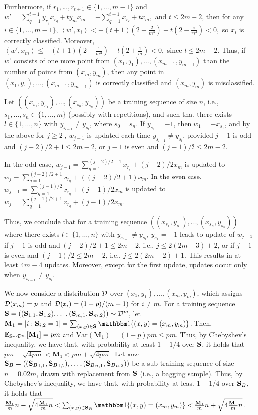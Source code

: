 Furthermore, if $r_1, \ldots, r_{t+1} \in \{1, \ldots, m-1\}$ and 
$
w' = \sum_{q=1}^{t+1} y_{r_q} x_{r_q} + t y_m x_m = -\sum_{q=1}^{t+1} x_{r_q} + t x_m,
$
and $t \leq 2m-2$, then for any $i \in \{1, \ldots, m-1\}$, 
$
\left\langle w', x_i \right\rangle < -(t+1)(2 - \frac{2}{m^3}) + t(2 - \frac{i}{m^4}) < 0,
$
so $x_i$ is correctly classified. Moreover, 
$
\left\langle w', x_m \right\rangle \leq -(t+1)(2 - \frac{1}{m^3}) + t(2 + \frac{1}{m}) < 0,
$
since $t\leq 2m-2$. Thus, if $w'$ consists of one more point from $(x_1, y_1), \ldots, (x_{m-1}, y_{m-1})$ than the number of points from $(x_m, y_m)$, then any point in $(x_1, y_1), \ldots, (x_{m-1}, y_{m-1})$ is correctly classified and $(x_m, y_m)$ is misclassified.

Let $((x_{s_{1}},y_{s_{1}}),\ldots,(x_{s_{n}},y_{s_{n}}))$ be a training sequence of size $n$, i.e., $s_{1},\ldots,s_{n}\in \{1,\ldots,m\}$ (possibly with repetitions), and such that there exists $l\in \{1,\ldots,n\}$ with $y_{s_{l-1}}\neq y_{s_{l}}$, where $s_{0}=s_{n}$. If $y_{s_{1}} = -1$, then $w_{1} = -x_{s_{1}}$, and by the above for $ j\geq 2 $ , $w_{j-1}$ is updated each time $y_{s_{l-1}}\neq y_{s_{l}}$, provided $j-1$ is odd and $(j-2)/2+1 \leq 2m-2$, or $j-1$ is even and $(j-1)/2 \leq 2m-2$.

In the odd case, $w_{j-1} = \sum_{q=1}^{(j-2)/2+1} x_{r_{q}} + (j-2)/2 x_{m}$ is updated to $w_{j} = \sum_{q=1}^{(j-2)/2+1} x_{r_{q}} + ((j-2)/2+1) x_{m}$. In the even case, $w_{j-1} = \sum_{q=1}^{(j-1)/2} x_{r_{q}} + (j-1)/2 x_{m}$ is updated to $w_{j} = \sum_{q=1}^{(j-1)/2+1} x_{r_{q}} + (j-1)/2 x_{m}$.

Thus, we conclude that for a training sequence $((x_{s_{1}},y_{s_{1}}),\ldots,(x_{s_{n}},y_{s_{n}}))$ where there exists $l \in \{1,\ldots,n\}$ with $y_{s_{l-1}}\neq y_{s_{l}}$, $y_{s_{1}} = -1$ leads to update of $ w_{j-1} $  if $j-1$ is odd and $(j-2)/2+1 \leq 2m-2$, i.e., $j \leq 2(2m-3)+2$, or if $j-1$ is even and $(j-1)/2 \leq 2m-2$, i.e., $j \leq 2(2m-2)+1$. This results in at least $4m-4$ updates. Moreover, except for the first update, updates occur only when $y_{s_{l-1}}\neq y_{s_{l}}$.

We now consider a distribution $\mathcal{D}$ over $(x_{1},y_{1}),\ldots,(x_{m},y_{m})$, which assigns $\mathcal{D}(x_{m})=p$ and $\mathcal{D}(x_{i})=(1-p)/(m-1)$ for $i\neq m$. For a training sequence $\mathbf{S} = ((\mathbf{S}_{1,1},\mathbf{S}_{1,2}),\ldots,(\mathbf{S}_{m,1},\mathbf{S}_{m,2})) \sim \mathcal{D}^{m}$, let $\mathbf{M}_{1} = |{i : \rS_{i,2}=1}| = \sum_{(x,y)\in \rS} \ind\{(x,y)=(x_{m},y_{m})\}$. Then, $\mathbb{E}_{\mathbf{S}\sim\mathcal{D}^{m}}[\mathbf{M}_{1}] = pm$ and $\text{Var}(\mathbf{M}_{1}) = (1-p)pm \leq pm$. Thus, by Chebyshev's inequality, we have that, with probability at least $1-1/4$ over $\mathbf{S}$, it holds that $pm-\sqrt{4pm} < \mathbf{M}_{1} < pm+\sqrt{4pm}$. Let now $\mathbf{S}_{B} = (({\mathbf{S}_{B}}_{1,1}, {\mathbf{S}_{B}}_{1,2}), \ldots, ({\mathbf{S}_{B}}_{n,1}, {\mathbf{S}_{B}}_{n,2}))$ be a sub-training sequence of size $n=0.02m$, drawn with replacement from $\mathbf{S}$ (i.e., a bagging sample). Thus, by Chebyshev's inequality, we have that, with probability at least $1-1/4$ over $\mathbf{S}_{B}$, it holds that $\frac{\mathbf{M}_{1}}{m}n-\sqrt{4\frac{\mathbf{M}_{1}}{m}n} < \sum_{(x,y) \in \rS_{B}} \ind\{(x,y) = (x_{m},y_{m})\} < \frac{\mathbf{M}_{1}}{m}n+\sqrt{4\frac{\mathbf{M}_{1}}{m}n}$.

